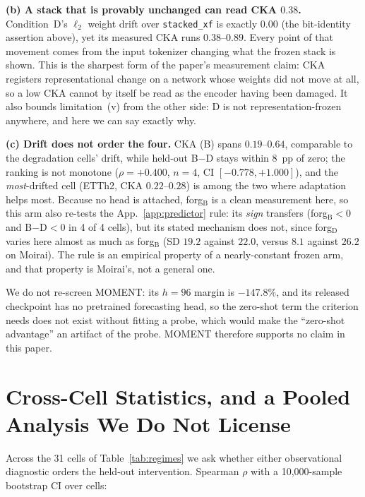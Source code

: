 \documentclass{article}
\begin{document}
\textbf{(b) A stack that is provably unchanged can read CKA $0.38$.} Condition~D's $\ell_2$ weight
drift over \texttt{stacked\_xf} is exactly $0.00$ (the bit-identity assertion above), yet its
measured CKA runs $0.38$--$0.89$. Every point of that movement comes from the input tokenizer
changing what the frozen stack is shown. This is the sharpest form of the paper's measurement claim:
CKA registers representational change on a network whose weights did not move at all, so a low CKA
cannot by itself be read as the encoder having been damaged. It also bounds limitation~(v) from the
other side: D is not representation-frozen anywhere, and here we can say exactly why.

\textbf{(c) Drift does not order the four.} CKA (B) spans $0.19$--$0.64$, comparable to the
degradation cells' drift, while held-out B$-$D stays within $8$~pp of zero; the ranking is not
monotone ($\rho{=}+0.400$, $n{=}4$, CI $[-0.778, +1.000]$), and the \emph{most}-drifted cell (ETTh2,
CKA $0.22$--$0.28$) is among the two where adaptation helps most. Because no head is attached,
forg$_\text{B}$ is a clean measurement here, so this arm also re-tests the App.~\ref{app:predictor}
rule: its \emph{sign} transfers (forg$_\text{B}{<}0$ and B$-$D${<}0$ in 4 of 4 cells), but its
stated mechanism does not, since forg$_\text{D}$ varies here almost as much as forg$_\text{B}$
(SD $19.2$ against $22.0$, versus $8.1$ against $26.2$ on Moirai). The rule is an empirical property
of a nearly-constant frozen arm, and that property is Moirai's, not a general one.

We do not re-screen MOMENT: its $h{=}96$ margin is $-147.8\%$, and its released checkpoint has no
pretrained forecasting head, so the zero-shot term the criterion needs does not exist without
fitting a probe, which would make the ``zero-shot advantage'' an artifact of the probe. MOMENT
therefore supports no claim in this paper.

\section{Cross-Cell Statistics, and a Pooled Analysis We Do Not License}
\label{app:crosscell}

Across the 31 cells of Table~\ref{tab:regimes} we ask whether either observational diagnostic
orders the held-out intervention. Spearman $\rho$ with a 10{,}000-sample bootstrap CI over cells:
\end{document}
